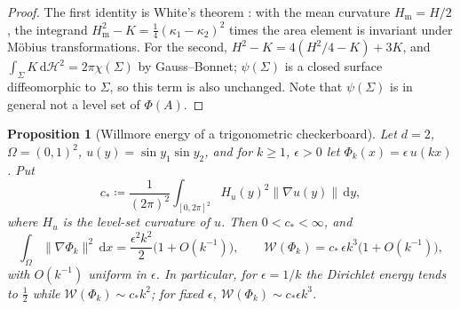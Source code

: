 \documentclass[11pt,a4paper,reqno]{amsart}
\newtheorem{proposition}[theorem]{Proposition}
\theoremstyle{definition}
\numberwithin{equation}{section}
\newcommand{\dif}{\,\mathrm{d}}
\begin{document}
\begin{proof}
The first identity is White's theorem \cite{white1973global}: with the mean curvature $H_{\mathrm{m}} = H/2$, the integrand $H_{\mathrm{m}}^2 - K = \frac14(\kappa_1 - \kappa_2)^2$ times the area element is invariant under M\"obius transformations. For the second, $H^2 - K = 4(H^2/4 - K) + 3K$, and $\int_\Sigma K \dif\mathcal{H}^2 = 2\pi\chi(\Sigma)$ by Gauss--Bonnet; $\psi(\Sigma)$ is a closed surface diffeomorphic to $\Sigma$, so this term is also unchanged. Note that $\psi(\Sigma)$ is in general not a level set of $\Phi(A)$.
\end{proof}

\begin{proposition}[Willmore energy of a trigonometric checkerboard]
\label{prop:willmore_scaling}
Let $d = 2$, $\Omega = (0,1)^2$, $u(y) = \sin y_1 \sin y_2$, and for $k \ge 1$, $\epsilon > 0$ let $\Phi_k(x) = \epsilon\, u(kx)$. Put
\begin{equation}
    c_* \coloneqq \frac{1}{(2\pi)^2} \int_{[0,2\pi]^2} H_u(y)^2 \|\nabla u(y)\| \dif y,
\end{equation}
where $H_u$ is the level-set curvature of $u$. Then $0 < c_* < \infty$, and
\begin{equation}
    \int_\Omega \|\nabla \Phi_k\|^2 \dif x = \frac{\epsilon^2 k^2}{2}\big(1 + O(k^{-1})\big), \qquad \mathcal{W}(\Phi_k) = c_*\, \epsilon k^3 \big(1 + O(k^{-1})\big),
\end{equation}
with $O(k^{-1})$ uniform in $\epsilon$. In particular, for $\epsilon = 1/k$ the Dirichlet energy tends to $\frac12$ while $\mathcal{W}(\Phi_k) \sim c_* k^2$; for fixed $\epsilon$, $\mathcal{W}(\Phi_k) \sim c_* \epsilon k^3$.
\end{proposition}
\end{document}
